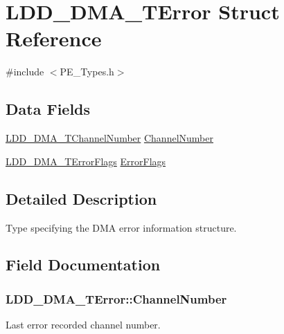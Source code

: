 \hypertarget{struct_l_d_d___d_m_a___t_error}{}\section{L\+D\+D\+\_\+\+D\+M\+A\+\_\+\+T\+Error Struct Reference}
\label{struct_l_d_d___d_m_a___t_error}


{\ttfamily \#include $<$P\+E\+\_\+\+Types.\+h$>$}

\subsection*{Data Fields}
\begin{DoxyCompactItemize}
\item 
\hyperlink{group___p_e___types__module_gad268d607015891269cb015faa8bc0dac}{L\+D\+D\+\_\+\+D\+M\+A\+\_\+\+T\+Channel\+Number} \hyperlink{struct_l_d_d___d_m_a___t_error_abc8d0c6909178bc7fe3957b7c01afd08}{Channel\+Number}
\item 
\hyperlink{group___p_e___types__module_gaea6d9250a094d0f060ae12a0b7abb474}{L\+D\+D\+\_\+\+D\+M\+A\+\_\+\+T\+Error\+Flags} \hyperlink{struct_l_d_d___d_m_a___t_error_a9dd0a645e1763b4daa0058b1b29c4ad7}{Error\+Flags}
\end{DoxyCompactItemize}


\subsection{Detailed Description}
Type specifying the D\+M\+A error information structure. 

\subsection{Field Documentation}
\hypertarget{struct_l_d_d___d_m_a___t_error_abc8d0c6909178bc7fe3957b7c01afd08}{}
\subsubsection[{Channel\+Number}]{ L\+D\+D\+\_\+\+D\+M\+A\+\_\+\+T\+Error\+::\+Channel\+Number}\label{struct_l_d_d___d_m_a___t_error_abc8d0c6909178bc7fe3957b7c01afd08}
Last error recorded channel number. \hypertarget{struct_l_d_d___d_m_a___t_error_a9dd0a645e1763b4daa0058b1b29c4ad7}{}
